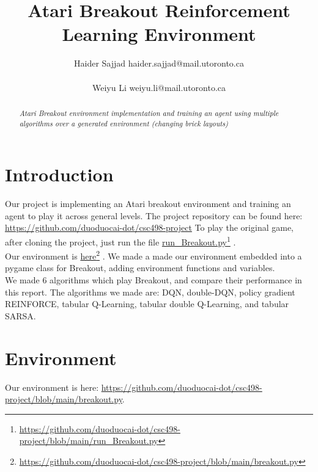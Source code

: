 \documentclass[twoside,11pt]{article}
\title{Atari Breakout Reinforcement Learning Environment}
\author{\name Haider Sajjad \email haider.sajjad@mail.utoronto.ca \\
       \addr 1004076251\\
       \AND
      \name Weiyu Li \email weiyu.li@mail.utoronto.ca \\
       \addr 1003765981}
\newcommand\fnurl[2]{%
  \href{#2}{#1}\footnote{\url{#2}}%
}
\begin{document}
\maketitle

\begin{abstract}%
\textit{
Atari Breakout environment implementation and training an agent using multiple algorithms over a generated environment (changing brick layouts)}

\end{abstract}

\section{Introduction}
Our project is implementing an Atari breakout environment and training an agent to play it across general levels. The project repository can be found here: \url{https://github.com/duoduocai-dot/csc498-project} To play the original game, after cloning the project, just run the file \fnurl{run\_Breakout.py}{https://github.com/duoduocai-dot/csc498-project/blob/main/run_Breakout.py}.\\
Our environment is \fnurl{here}{https://github.com/duoduocai-dot/csc498-project/blob/main/breakout.py}. We made a made our environment embedded into a pygame class for Breakout, adding environment functions and variables. \\
We made 6 algorithms which play Breakout, and compare their performance in this report. The algorithms we made are: DQN, double-DQN, policy gradient REINFORCE, tabular Q-Learning, tabular double Q-Learning, and tabular SARSA.

\section{Environment}
Our environment is here: \url{https://github.com/duoduocai-dot/csc498-project/blob/main/breakout.py}.
\end{document}
